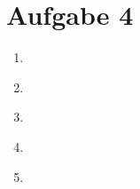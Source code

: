 \documentclass{article}
\begin{document}
\section*{Aufgabe 4}
    \begin{enumerate}
        \item
            \begin{verbatim}
            \end{verbatim}
        \item
            \begin{verbatim}
            \end{verbatim}
        \item
            \begin{verbatim}
            \end{verbatim}
        \item
            \begin{verbatim}
            \end{verbatim}
        \item
            \begin{verbatim}
            \end{verbatim}
    \end{enumerate}
\end{document}
